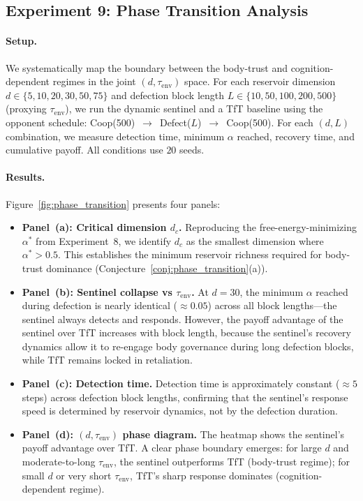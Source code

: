 \documentclass[11pt,a4paper]{article}
\theoremstyle{definition}
\begin{document}
\subsection{Experiment 9: Phase Transition Analysis}
\label{sec:exp_phase_transition}

\paragraph{Setup.}
We systematically map the boundary between the body-trust and
cognition-dependent regimes in the joint $(d, \tau_{\mathrm{env}})$ space.
For each reservoir dimension $d \in \{5, 10, 20, 30, 50, 75\}$ and
defection block length $L \in \{10, 50, 100, 200, 500\}$ (proxying
$\tau_{\mathrm{env}}$), we run the dynamic sentinel and a TfT baseline
using the opponent schedule: Coop(500)~$\to$~Defect($L$)~$\to$~Coop(500).
For each $(d, L)$ combination, we measure detection time, minimum $\alpha$
reached, recovery time, and cumulative payoff.  All conditions use $20$
seeds.

\paragraph{Results.}
Figure~\ref{fig:phase_transition} presents four panels:
\begin{itemize}[nosep]
  \item \textbf{Panel~(a): Critical dimension $d_c$.}
    Reproducing the free-energy-minimizing $\alpha^{*}$ from Experiment~8,
    we identify $d_c$ as the smallest dimension where $\alpha^{*} > 0.5$.
    This establishes the minimum reservoir richness required for body-trust
    dominance (Conjecture~\ref{conj:phase_transition}(a)).

  \item \textbf{Panel~(b): Sentinel collapse vs $\tau_{\mathrm{env}}$.}
    At $d = 30$, the minimum $\alpha$ reached during defection is nearly
    identical ($\approx 0.05$) across all block lengths---the sentinel always
    detects and responds.  However, the payoff advantage of the sentinel over
    TfT increases with block length, because the sentinel's recovery dynamics
    allow it to re-engage body governance during long defection blocks, while
    TfT remains locked in retaliation.

  \item \textbf{Panel~(c): Detection time.}
    Detection time is approximately constant ($\approx 5$ steps) across
    defection block lengths, confirming that the sentinel's response speed
    is determined by reservoir dynamics, not by the defection duration.

  \item \textbf{Panel~(d): $(d, \tau_{\mathrm{env}})$ phase diagram.}
    The heatmap shows the sentinel's payoff advantage over TfT.
    A clear phase boundary emerges: for large $d$ and moderate-to-long
    $\tau_{\mathrm{env}}$, the sentinel outperforms TfT (body-trust regime);
    for small $d$ or very short $\tau_{\mathrm{env}}$, TfT's sharp response
    dominates (cognition-dependent regime).
\end{itemize}
\end{document}
